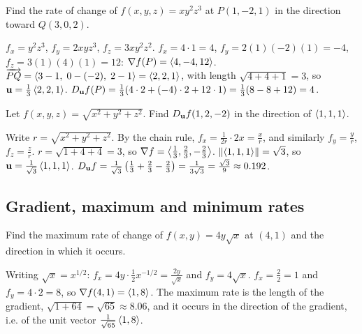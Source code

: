 \begin{problem}\label{prob:p12}
Find the rate of change of $f(x,y,z)=xy^2z^3$ at $P(1,-2,1)$ in the direction
toward $Q(3,0,2)$.
\end{problem}
\begin{solution}
 $f_x=y^2z^3$, $f_y=2xyz^3$, $f_z=3xy^2z^2$.
 $f_x=4\cdot1=4$, $f_y=2(1)(-2)(1)=-4$, $f_z=3(1)(4)(1)=12$: $\nabla f(P)=\left\langle 4,-4,12 \right\rangle$.
 $\overrightarrow{PQ}=\left\langle 3-1,\;0-(-2),\;2-1 \right\rangle=\left\langle 2,2,1 \right\rangle$, with length $\sqrt{4+4+1}=3$, so
$\mathbf{u}=\frac13\left\langle 2,2,1 \right\rangle$.
 $D_{\mathbf{u}} f(P)=\frac13(4\cdot2+(-4)\cdot2+12\cdot1)=\frac13(8-8+12)=4$.
\end{solution}

\begin{problem}\label{prob:p13}
Let $f(x,y,z)=\sqrt{x^2+y^2+z^2}$. Find $D_{\mathbf{u}} f(1,2,-2)$ in the direction of
$\left\langle 1,1,1 \right\rangle$.
\end{problem}
\begin{solution}
 Write $r=\sqrt{x^2+y^2+z^2}$. By the chain rule,
$f_x=\frac{1}{2r}\cdot2x=\frac xr$, and similarly $f_y=\frac yr$, $f_z=\frac zr$.
 $r=\sqrt{1+4+4}=3$, so $\nabla f=\left\langle \frac13,\frac23,-\frac23 \right\rangle$.
 $\lVert\left\langle 1,1,1 \right\rangle\rVert=\sqrt3$, so $\mathbf{u}=\frac{1}{\sqrt3}\left\langle 1,1,1 \right\rangle$.
$D_{\mathbf{u}} f=\frac{1}{\sqrt3}\left(\frac13+\frac23-\frac23\right)=\frac{1}{3\sqrt3}=\frac{\sqrt3}{9}\approx0.192$.
\end{solution}

\subsection{Gradient, maximum and minimum rates}

\begin{problem}\label{prob:p14}
Find the maximum rate of change of $f(x,y)=4y\sqrt x$ at $(4,1)$ and the
direction in which it occurs.
\end{problem}
\begin{solution}
 Writing $\sqrt x=x^{1/2}$: $f_x=4y\cdot\frac12x^{-1/2}=\frac{2y}{\sqrt x}$ and $f_y=4\sqrt x$.
 $f_x=\frac{2}{2}=1$ and $f_y=4\cdot2=8$, so $\nabla f(4,1)=\left\langle 1,8 \right\rangle$.
 The maximum rate is the length of the gradient,
$\sqrt{1+64}=\sqrt{65}\approx8.06$, and it occurs in the direction of the gradient, i.e. of the
unit vector $\frac{1}{\sqrt{65}}\left\langle 1,8 \right\rangle$.
\end{solution}

